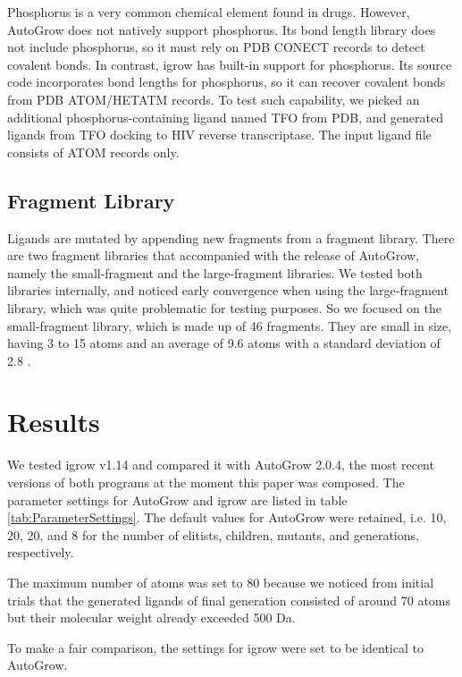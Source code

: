\documentclass[10pt, conference, compsocconf]{../IEEEtran}
\begin{document}
Phosphorus is a very common chemical element found in drugs. However, AutoGrow does not natively support phosphorus. Its bond length library does not include phosphorus, so it must rely on PDB CONECT records to detect covalent bonds. In contrast, igrow has built-in support for phosphorus. Its source code incorporates bond lengths for phosphorus, so it can recover covalent bonds from PDB ATOM/HETATM records. To test such capability, we picked an additional phosphorus-containing ligand named TFO from PDB, and generated ligands from TFO docking to HIV reverse transcriptase. The input ligand file consists of ATOM records only.

\subsection{Fragment Library}

Ligands are mutated by appending new fragments from a fragment library. There are two fragment libraries that accompanied with the release of AutoGrow, namely the small-fragment and the large-fragment libraries. We tested both libraries internally, and noticed early convergence when using the large-fragment library, which was quite problematic for testing purposes. So we focused on the small-fragment library, which is made up of 46 fragments. They are small in size, having 3 to 15 atoms and an average of 9.6 atoms with a standard deviation of 2.8 \cite{114}.

\section{Results}

We tested igrow v1.14 and compared it with AutoGrow 2.0.4, the most recent versions of both programs at the moment this paper was composed. The parameter settings for AutoGrow and igrow are listed in table \ref{tab:ParameterSettings}. The default values for AutoGrow were retained, i.e. 10, 20, 20, and 8 for the number of elitists, children, mutants, and generations, respectively.

The maximum number of atoms was set to 80 because we noticed from initial trials that the generated ligands of final generation consisted of around 70 atoms but their molecular weight already exceeded 500 Da.

To make a fair comparison, the settings for igrow were set to be identical to AutoGrow.
\end{document}
